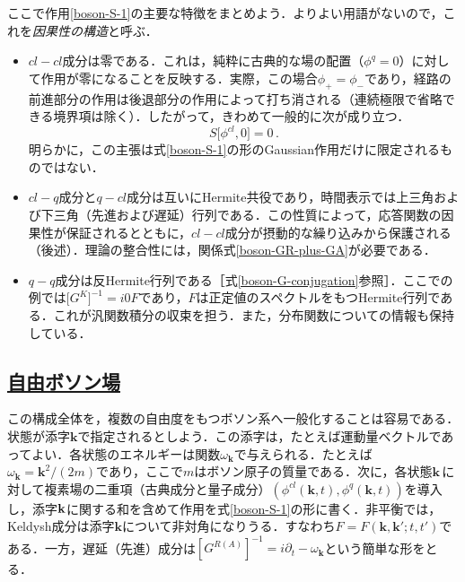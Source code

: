 \documentclass[a4paper,11pt]{ltjsarticle}
\newcommand{\subsectionlink}[1]{\subsection[#1]{\hyperlink{toc}{#1}}}
\begin{document}
ここで作用\eqref{boson-S-1}の主要な特徴をまとめよう．よりよい用語がないので，これを\emph{因果性の構造}と呼ぶ．
\begin{itemize}
\item $cl-cl$成分は零である．これは，純粋に古典的な場の配置（$\phi^q=0$）に対して作用が零になることを反映する．実際，この場合$\phi_+=\phi_-$であり，経路の前進部分の作用は後退部分の作用によって打ち消される（連続極限で省略できる境界項は除く）．したがって，きわめて一般的に次が成り立つ．
\begin{equation}\label{boson-causality}
S\big[\phi^{cl},0\big] = 0\, .
\end{equation}明らかに，この主張は式\eqref{boson-S-1}の形のGaussian作用だけに限定されるものではない．


\item $cl-q$成分と$q-cl$成分は互いにHermite共役であり，時間表示では上三角および下三角（先進および遅延）行列である．この性質によって，応答関数の因果性が保証されるとともに，$cl-cl$成分が摂動的な繰り込みから保護される（後述）．理論の整合性には，関係式\eqref{boson-GR-plus-GA}が必要である．


\item $q-q$成分は反Hermite行列である［式\eqref{boson-G-conjugation}参照］．ここでの例では$\big[G^K\big]^{-1}=i0F$であり，$F$は正定値のスペクトルをもつHermite行列である．これが汎関数積分の収束を担う．また，分布関数についての情報も保持している．
\end{itemize}


\subsectionlink{自由ボソン場}\label{sec_bosons-4}


この構成全体を，複数の自由度をもつボソン系へ一般化することは容易である．状態が添字$\mathbf{k}$で指定されるとしよう．この添字は，たとえば運動量ベクトルであってよい．各状態のエネルギーは関数$\omega_\mathbf{k}$で与えられる．たとえば$\omega_{\mathbf{k}}=\mathbf{k}^2/(2m)$であり，ここで$m$はボソン原子の質量である．次に，各状態$\mathbf{k}\,$に対して複素場の二重項（古典成分と量子成分）$(\phi^{cl}(\mathbf{k},t), \phi^{q}(\mathbf{k},t))$を導入し，添字$\bf{k}$に関する和を含めて作用を式\eqref{boson-S-1}の形に書く．非平衡では，Keldysh成分は添字$\mathbf{k}$について非対角になりうる．すなわち$F=F(\mathbf{k},\mathbf{k}';t,t')$である．一方，遅延（先進）成分は$[G^{R(A)}]^{-1}=i\partial_t -\omega_\mathbf{k}$という簡単な形をとる．
\end{document}
